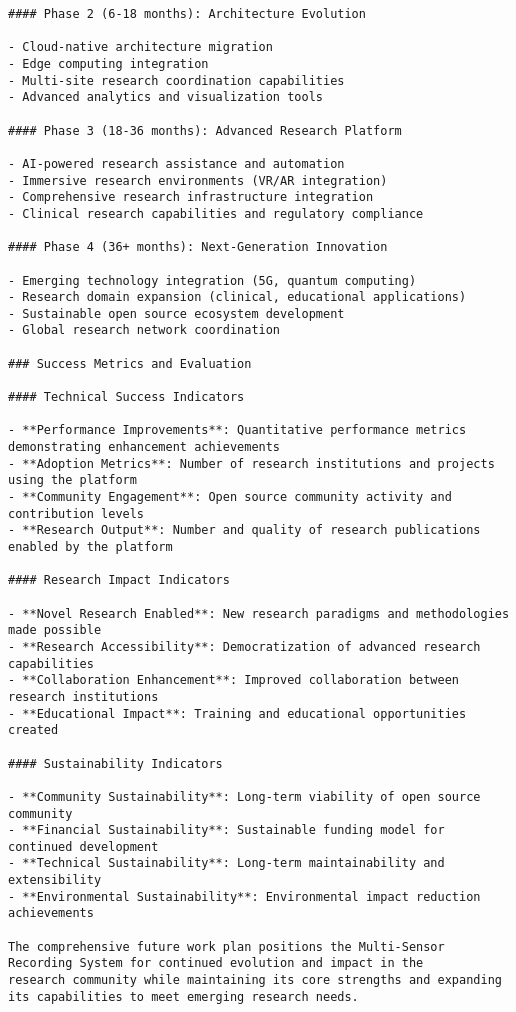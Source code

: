 \documentclass[11pt,a4paper]{report}
\begin{document}
\begin{verbatim}
#### Phase 2 (6-18 months): Architecture Evolution

- Cloud-native architecture migration
- Edge computing integration
- Multi-site research coordination capabilities
- Advanced analytics and visualization tools

#### Phase 3 (18-36 months): Advanced Research Platform

- AI-powered research assistance and automation
- Immersive research environments (VR/AR integration)
- Comprehensive research infrastructure integration
- Clinical research capabilities and regulatory compliance

#### Phase 4 (36+ months): Next-Generation Innovation

- Emerging technology integration (5G, quantum computing)
- Research domain expansion (clinical, educational applications)
- Sustainable open source ecosystem development
- Global research network coordination

### Success Metrics and Evaluation

#### Technical Success Indicators

- **Performance Improvements**: Quantitative performance metrics demonstrating enhancement achievements
- **Adoption Metrics**: Number of research institutions and projects using the platform
- **Community Engagement**: Open source community activity and contribution levels
- **Research Output**: Number and quality of research publications enabled by the platform

#### Research Impact Indicators

- **Novel Research Enabled**: New research paradigms and methodologies made possible
- **Research Accessibility**: Democratization of advanced research capabilities
- **Collaboration Enhancement**: Improved collaboration between research institutions
- **Educational Impact**: Training and educational opportunities created

#### Sustainability Indicators

- **Community Sustainability**: Long-term viability of open source community
- **Financial Sustainability**: Sustainable funding model for continued development
- **Technical Sustainability**: Long-term maintainability and extensibility
- **Environmental Sustainability**: Environmental impact reduction achievements

The comprehensive future work plan positions the Multi-Sensor Recording System for continued evolution and impact in the
research community while maintaining its core strengths and expanding its capabilities to meet emerging research needs.


\end{verbatim}
\end{document}
